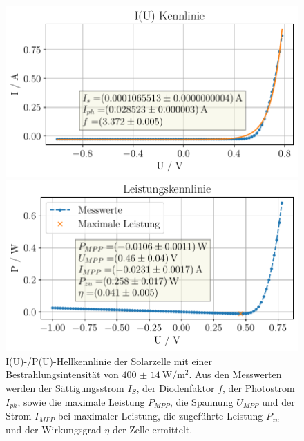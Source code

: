\documentclass[english, ngerman]{scrartcl}
\begin{document}
\setcapindent{0pt}
\begin{figure}[H]
    \centering
    \begin{minipage}[t]{0.485\linewidth}
        \centering
        \includegraphics[width=\linewidth]{fig/plots/400_UI.pdf}
    \end{minipage}%
    \hspace*{\fill}
    \begin{minipage}[t]{0.485\linewidth}
        \centering
        \includegraphics[width=\linewidth]{fig/plots/400_P.pdf}
    \end{minipage}
    \caption[I(U)-/P(U)-Hellkennlinie Solarzelle -- Sonnensimulator]{I(U)-/P(U)-Hellkennlinie der Solarzelle mit einer Bestrahlungsintensität von $\SI{400(14)}{\watt\per\meter\squared}$. Aus den Messwerten werden der Sättigungsstrom $I_S$, der Diodenfaktor $f$, der Photostrom $I_{ph}$, sowie die maximale Leistung $P_{MPP}$, die Spannung $U_{MPP}$ und der Strom $I_{MPP}$ bei maximaler Leistung, die zugeführte Leistung $P_{zu}$ und der Wirkungsgrad $\eta$ der Zelle ermittelt.}
    \label{fig:solar_Hell_400}
\end{figure}
\setcaphanging
\end{document}
